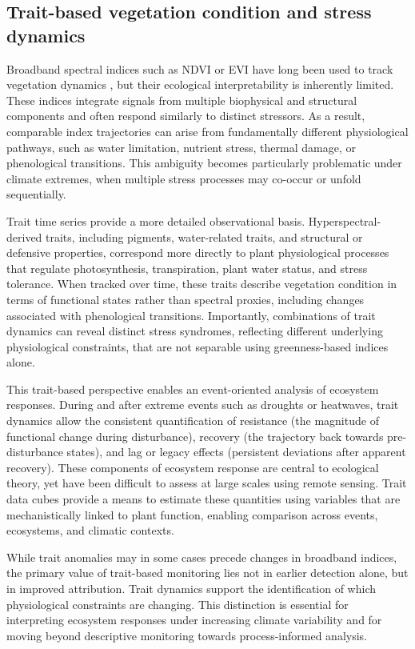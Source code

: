 \documentclass[pdflatex,sn-mathphys-num]{sn-jnl}%
\theoremstyle{thmstyleone}%
\theoremstyle{thmstyletwo}%
\theoremstyle{thmstylethree}%
\begin{document}
\subsection{Trait-based vegetation condition and stress dynamics}

Broadband spectral indices such as NDVI or EVI have long been used to track vegetation dynamics \cite{zeng2022optical}, but their ecological interpretability is inherently limited. These indices integrate signals from multiple biophysical and structural components and often respond similarly to distinct stressors. As a result, comparable index trajectories can arise from fundamentally different physiological pathways, such as water limitation, nutrient stress, thermal damage, or phenological transitions. This ambiguity becomes particularly problematic under climate extremes, when multiple stress processes may co-occur or unfold sequentially.

Trait time series provide a more detailed observational basis. Hyperspectral-derived traits, including pigments, water-related traits, and structural or defensive properties, correspond more directly to plant physiological processes that regulate photosynthesis, transpiration, plant water status, and stress tolerance. When tracked over time, these traits describe vegetation condition in terms of functional states rather than spectral proxies, including changes associated with phenological transitions. Importantly, combinations of trait dynamics can reveal distinct stress syndromes, reflecting different underlying physiological constraints, that are not separable using greenness-based indices alone.

This trait-based perspective enables an event-oriented analysis of ecosystem responses. During and after extreme events such as droughts or heatwaves, trait dynamics allow the consistent quantification of resistance (the magnitude of functional change during disturbance), recovery (the trajectory back towards pre-disturbance states), and lag or legacy effects (persistent deviations after apparent recovery). These components of ecosystem response are central to ecological theory, yet have been difficult to assess at large scales using remote sensing. Trait data cubes provide a means to estimate these quantities using variables that are mechanistically linked to plant function, enabling comparison across events, ecosystems, and climatic contexts.

While trait anomalies may in some cases precede changes in broadband indices, the primary value of trait-based monitoring lies not in earlier detection alone, but in improved attribution. Trait dynamics support the identification of which physiological constraints are changing. This distinction is essential for interpreting ecosystem responses under increasing climate variability and for moving beyond descriptive monitoring towards process-informed analysis.
\end{document}
